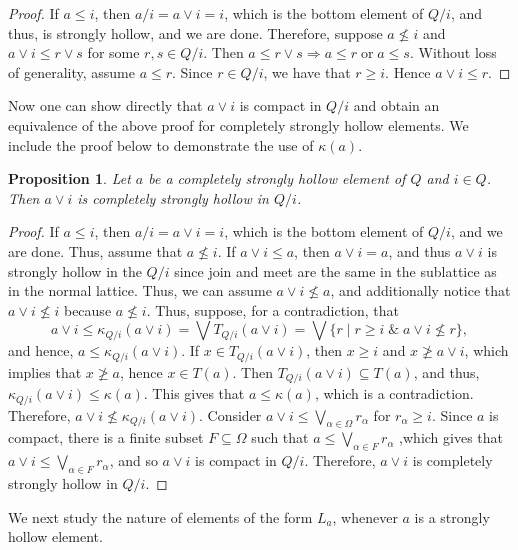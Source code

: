 \documentclass[11pt,english]{amsart}
\newtheorem{proposition}[theorem]{Proposition}
\theoremstyle{definition}
\numberwithin{equation}{section}
\theoremstyle{remark}
\def\leq{\leqslant}
\begin{document}
	\begin{proof}
		If $a\leq i$, then $a/i =a\vee i = i$, which is the bottom element of $Q/i$, and thus, is strongly hollow, and we are done. Therefore, suppose  $a\nleq i$ and $a\vee i \leq r\vee s$ for some $r,s\in Q/i$. Then $a\leq r\vee s \Rightarrow a\leq r \; \text{or} \; a\leq s$. Without loss of generality, assume $a\leq r$. Since $r\in Q/i$, we have that $r\geqslant i$. Hence $a\vee i\leq r$.
	\end{proof}
	
	Now one can show directly that $a\vee i$ is compact in $Q/i$ and obtain an equivalence of the above proof for completely strongly hollow elements. We include the proof below to demonstrate the use of $\kappa(a)$. 
	
	\begin{proposition}
		Let $a$ be a completely strongly hollow element of $Q$ and $i\in Q$. Then $a\vee i$ is completely strongly hollow in $Q/i$.
	\end{proposition}
	
	\begin{proof}
		If $a\leq i$, then $a/i =a\vee i = i$, which is the bottom element of $Q/i$, and we are done. Thus, assume that $a\nleq i$. If $a\vee i \leq a$, then $a\vee i = a$, and thus $a\vee i$ is strongly hollow in the $Q/i$ since join and meet are the same in the sublattice as in the normal lattice. Thus, we can assume $a\vee i \nleq a$, and additionally notice that $a\vee i \nleq i$ because $a\nleq i $. Thus, suppose, for a contradiction, that \[a\vee i \leq \kappa_{Q/i}(a\vee i)= \bigvee T_{Q/i}(a\vee i) = \bigvee\{r\mid r\geqslant i \; \& \; a\vee i \nleq r\},\] and hence, $a\leq \kappa_{Q/i}(a\vee i)$. If $x\in T_{Q/i}(a\vee i)$, then $x\geqslant i$ and $x\ngeq a\vee i$, which implies that $x\ngeq a$, hence $x\in T(a)$. Then $T_{Q/i}(a\vee i) \subseteq T(a)$, and thus, $\kappa_{Q/i}(a\vee i) \leq \kappa(a)$. This gives that $a\leq \kappa(a)$, which is a contradiction. Therefore, $a\vee i\nleq\kappa_{Q/i}(a\vee i)$. Consider $a\vee i\leq \bigvee_{\alpha\in\Omega}r_\alpha$ for $r_\alpha \geqslant i$. Since $a$ is compact, there is a finite subset $F\subseteq \Omega$ such that $a\leq \bigvee_{\alpha\in F}r_\alpha$ ,which gives that $a\vee i\leq\bigvee_{\alpha \in F}r_\alpha$, and so $a\vee i$ is compact in $Q/i$. Therefore, $a\vee i$ is completely strongly hollow in $Q/i$.
	\end{proof}
	
	We next study the nature of elements of the form $L_a$, whenever $a$ is a strongly hollow element.
	
\end{document}
